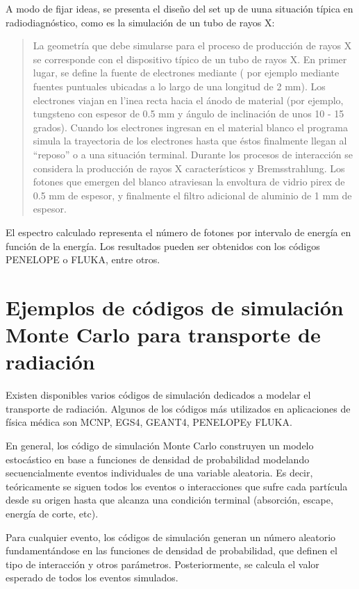 A modo de fijar ideas, se presenta el diseño del set up de uuna situación típica en radiodiagnóstico, como es la simulación de un tubo de rayos X:

\begin{quote}
La geometría que debe simularse para el proceso de producción de rayos X se corresponde con el dispositivo típico de un tubo de rayos X. En primer lugar, se define la fuente de electrones mediante ( por ejemplo mediante fuentes puntuales ubicadas a lo largo de una longitud de 2 mm). Los electrones viajan en l’inea recta hacia el ánodo de material (por ejemplo, tungsteno con espesor de 0.5 mm y ángulo de inclinación de unos 10 - 15 grados). Cuando los electrones ingresan en el material blanco el programa simula la trayectoria de los electrones hasta que éstos finalmente llegan al “reposo” o a una situación terminal. Durante los procesos de interacción se considera la producción de rayos X característicos y Bremsstrahlung. Los fotones que emergen del blanco atraviesan la envoltura de vidrio pirex de 0.5 mm de espesor, y finalmente el filtro adicional de aluminio de 1 mm de espesor. 
\end{quote}

El espectro calculado representa el número de fotones por intervalo de energía en función de la energía. Los resultados pueden ser obtenidos con los códigos PENELOPE o FLUKA, entre otros.

\section{Ejemplos de c\'odigos de simulaci\'on Monte Carlo para transporte de radiaci\'on}

Existen disponibles varios códigos de simulación dedicados a modelar el transporte de radiación. Algunos de los códigos más utilizados en aplicaciones de física médica son MCNP, EGS4, GEANT4, PENELOPEy FLUKA.

En general, los código de simulación Monte Carlo construyen un modelo estocástico en base a funciones de densidad de probabilidad modelando secuencialmente eventos individuales de una variable aleatoria. Es decir, teóricamente se siguen todos los eventos o interacciones que sufre cada partícula desde su origen hasta que alcanza una condición terminal (absorción, escape, energía de corte, etc). 

Para cualquier evento, los códigos de simulación generan un número aleatorio fundamentándose en las funciones de densidad de probabilidad, que definen el tipo de interacción y otros parámetros. Posteriormente, se calcula el valor esperado de todos los eventos simulados.

